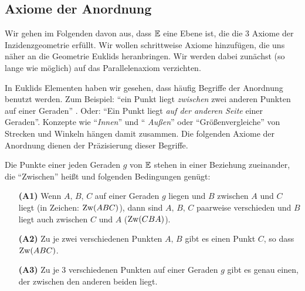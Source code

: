 \subsection*{Axiome der Anordnung}



Wir gehen im Folgenden davon aus, dass $\mathbb E$ eine Ebene ist, die die 3 Axiome der Inzidenzgeometrie
erfüllt. Wir wollen schrittweise Axiome hinzufügen, die uns näher an die Geometrie Euklids
heranbringen.  Wir werden dabei zunächst (so lange wie möglich) auf das Parallelenaxiom verzichten.

In Euklids Elementen haben wir gesehen, dass häufig Begriffe der Anordnung benutzt werden. Zum
Beispiel: "`ein Punkt %
liegt {\em zwischen} zwei anderen Punkten %
auf einer Geraden"' .
Oder: "`Ein Punkt %
liegt {\em auf der anderen Seite} einer Geraden"'. Konzepte wie "`{\em Innen}"' und "`{\em
Außen}"' oder "`Größenvergleiche"' von Strecken und Winkeln hängen damit zusammen. Die folgenden
Axiome der Anordnung dienen der Präzisierung dieser Begriffe.

Die Punkte einer jeden Geraden $g$ von $\mathbb E$ stehen in einer Beziehung zueinander, die "`Zwischen"'
heißt und folgenden Bedingungen genügt:

\begin{enumerate}
    \item[{\bf (A1)}] Wenn $A,\,B,\,C$ auf einer Geraden $g$ liegen und $B$ zwischen $A$ und $C$
        liegt (in Zeichen: $\operatorname{Zw}(ABC)$), dann sind $A,\,B,\,C$ paarweise verschieden und $B$ liegt
        auch zwischen $C$ und $A$ ($\operatorname{Zw}(CBA)$).

    \item[{\bf (A2)}] Zu je zwei verschiedenen Punkten $A,\,B$ gibt es einen Punkt $C$, so dass
        $\operatorname{Zw}(ABC)$.

    \item[{\bf (A3)}] Zu je 3 verschiedenen Punkten auf einer Geraden $g$ gibt es genau einen, der
        zwischen den anderen beiden liegt.
\end{enumerate}

